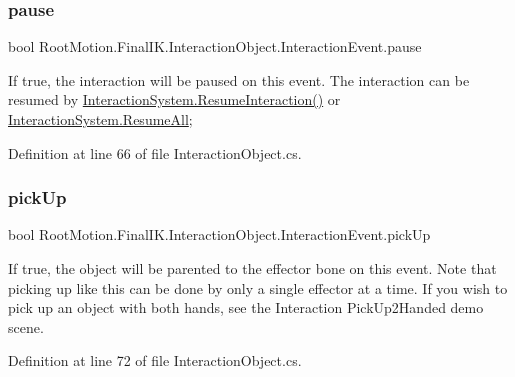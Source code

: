 \subsubsection{\texorpdfstring{pause}{pause}}
{\footnotesize\ttfamily bool Root\+Motion.\+Final\+I\+K.\+Interaction\+Object.\+Interaction\+Event.\+pause}



If true, the interaction will be paused on this event. The interaction can be resumed by \mbox{\hyperlink{class_root_motion_1_1_final_i_k_1_1_interaction_system_ac201f874a5a9e7f12e648329d5f8e31a}{Interaction\+System.\+Resume\+Interaction()}} or \mbox{\hyperlink{class_root_motion_1_1_final_i_k_1_1_interaction_system_a19f513364b351e2248196e99abb14071}{Interaction\+System.\+Resume\+All}}; 



Definition at line 66 of file Interaction\+Object.\+cs.

\mbox{\label{class_root_motion_1_1_final_i_k_1_1_interaction_object_1_1_interaction_event_a259370c35eb976f191f45496f4638621}} 
\subsubsection{\texorpdfstring{pick\+Up}{pickUp}}
{\footnotesize\ttfamily bool Root\+Motion.\+Final\+I\+K.\+Interaction\+Object.\+Interaction\+Event.\+pick\+Up}



If true, the object will be parented to the effector bone on this event. Note that picking up like this can be done by only a single effector at a time. If you wish to pick up an object with both hands, see the Interaction Pick\+Up2\+Handed demo scene. 



Definition at line 72 of file Interaction\+Object.\+cs.

\mbox{\label{class_root_motion_1_1_final_i_k_1_1_interaction_object_1_1_interaction_event_a6925097f5313118f479be761908336ad}} 
